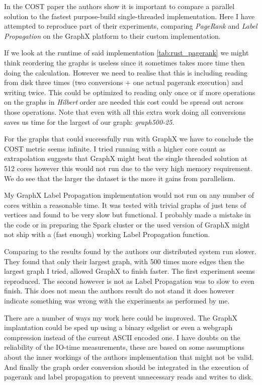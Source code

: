 In the COST paper the authors show it is important to compare a parallel solution to the fastest purpose-build single-threaded implementation. Here I have attempted to reproduce part of their experiments, comparing \textit{PageRank} and \textit{Label Propagation} on the GraphX platform to their custom implementation.

If we look at the runtime of said implementation \cref{tab:rust_pagerank} we might think reordering the graphs is useless since it sometimes takes more time then doing the calculation. However we need to realise that this is including reading from disk three times (two conversions + one actual pagerank execution) and writing twice. This could be optimized to reading only once or if more operations on the graphs in \textit{Hilbert} order are needed this cost could be spread out across those operations. Note that even with all this extra work doing all conversions saves us time for the largest of our graph: \textit{graph500-25}.

For the graphs that could successfully run with GraphX we have to conclude the COST metric seems infinite. I tried running with a higher core count as extrapolation suggests that GraphX might beat the single threaded solution at 512 cores however this would not run due to the very high memory requirement. We do see that the larger the dataset is the more it gains from parallelism. 

My GraphX Label Propagation implementation would not run on any number of cores within a reasonable time. It was tested with trivial graphs of just tens of vertices and found to be very slow but functional. I probably made a mistake in the code or in preparing the Spark cluster or the used version of GraphX might not ship with a (fast enough) working Label Propagation function. 

Comparing to the results found by the authors \cite{189908} our distributed system run slower. They found that only their largest graph, with 500 times more edges then the largest graph I tried, allowed GraphX to finish faster. The first experiment seems reproduced. The second however is not as Label Propagation was to slow to even finish. This does not mean the authors result do not stand it does however indicate something was wrong with the experiments as performed by me.

There are a number of ways my work here could be improved. The GraphX implantation could be sped up using a binary edgelist or even a webgraph compression\cite{webgraph} instead of the current ASCII encoded one. I have doubts on the reliability of the IO-time measurements, these are based on some assumptions about the inner workings of the authors implementation that might not be valid. And finally the graph order conversion should be integrated in the execution of pagerank and label propagation to prevent unnecessary reads and writes to disk.
